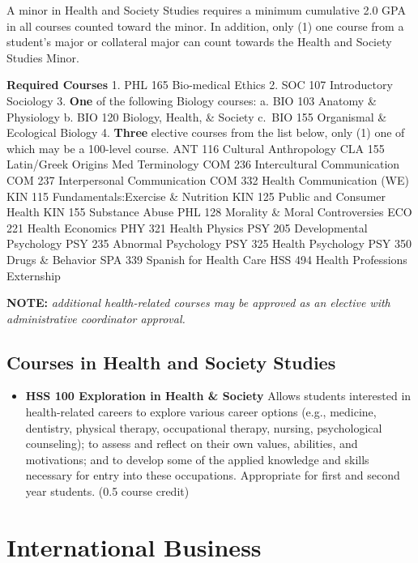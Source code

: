 \documentclass[
  letterpaper,
]{scrbook}
\providecommand{\tightlist}{%
  \setlength{\itemsep}{0pt}\setlength{\parskip}{0pt}}
\begin{document}
A minor in Health and Society Studies requires a minimum cumulative 2.0
GPA in all courses counted toward the minor. In addition, only (1) one
course from a student's major or collateral major can count towards the
Health and Society Studies Minor.

\textbf{Required Courses} 1. PHL 165 Bio-medical Ethics 2. SOC 107
Introductory Sociology 3. \textbf{One} of the following Biology courses:
a. BIO 103 Anatomy \& Physiology b. BIO 120 Biology, Health, \& Society
c.~BIO 155 Organismal \& Ecological Biology 4. \textbf{Three} elective
courses from the list below, only (1) one of which may be a 100-level
course. ANT 116 Cultural Anthropology CLA 155 Latin/Greek Origins Med
Terminology COM 236 Intercultural Communication COM 237 Interpersonal
Communication COM 332 Health Communication (WE) KIN 115
Fundamentals:Exercise \& Nutrition KIN 125 Public and Consumer Health
KIN 155 Substance Abuse PHL 128 Morality \& Moral Controversies ECO 221
Health Economics PHY 321 Health Physics PSY 205 Developmental Psychology
PSY 235 Abnormal Psychology PSY 325 Health Psychology PSY 350 Drugs \&
Behavior SPA 339 Spanish for Health Care HSS 494 Health Professions
Externship

\textbf{NOTE:} \emph{additional health-related courses may be approved
as an elective with administrative coordinator approval.}

\hypertarget{courses-in-health-and-society-studies-1}{%
\subsection{Courses in Health and Society
Studies}\label{courses-in-health-and-society-studies-1}}

\begin{itemize}
\tightlist
\item
  \textbf{HSS 100 Exploration in Health \& Society} Allows students
  interested in health-related careers to explore various career options
  (e.g., medicine, dentistry, physical therapy, occupational therapy,
  nursing, psychological counseling); to assess and reflect on their own
  values, abilities, and motivations; and to develop some of the applied
  knowledge and skills necessary for entry into these occupations.
  Appropriate for first and second year students. (0.5 course credit)
\end{itemize}

\hypertarget{sec-international-business}{%
\section{International Business}\label{sec-international-business}}
\end{document}
